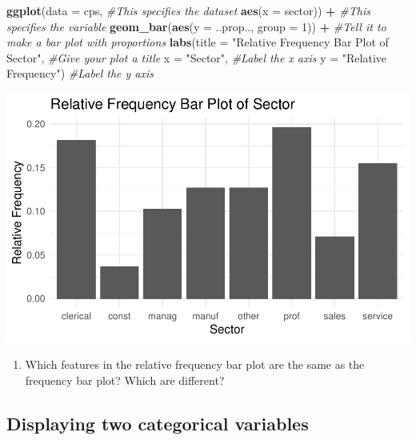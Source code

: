 \documentclass[
]{report}
\newenvironment{Shaded}{\begin{snugshade}}{\end{snugshade}}
\newcommand{\CommentTok}[1]{\textcolor[rgb]{0.56,0.35,0.01}{\textit{#1}}}
\newcommand{\DataTypeTok}[1]{\textcolor[rgb]{0.13,0.29,0.53}{#1}}
\newcommand{\DecValTok}[1]{\textcolor[rgb]{0.00,0.00,0.81}{#1}}
\newcommand{\KeywordTok}[1]{\textcolor[rgb]{0.13,0.29,0.53}{\textbf{#1}}}
\newcommand{\NormalTok}[1]{#1}
\newcommand{\OperatorTok}[1]{\textcolor[rgb]{0.81,0.36,0.00}{\textbf{#1}}}
\newcommand{\StringTok}[1]{\textcolor[rgb]{0.31,0.60,0.02}{#1}}
\providecommand{\tightlist}{%
  \setlength{\itemsep}{0pt}\setlength{\parskip}{0pt}}
\begin{document}
\begin{Shaded}
\begin{Highlighting}[]
\KeywordTok{ggplot}\NormalTok{(}\DataTypeTok{data =}\NormalTok{ cps,   }\CommentTok{#This specifies the dataset}
       \KeywordTok{aes}\NormalTok{(}\DataTypeTok{x =}\NormalTok{ sector)) }\OperatorTok{+}\StringTok{   }\CommentTok{#This specifies the variable}
\StringTok{  }\KeywordTok{geom_bar}\NormalTok{(}\KeywordTok{aes}\NormalTok{(}\DataTypeTok{y =}\NormalTok{ ..prop.., }\DataTypeTok{group =} \DecValTok{1}\NormalTok{)) }\OperatorTok{+}\StringTok{  }\CommentTok{#Tell it to make a bar plot with proportions}
\StringTok{  }\KeywordTok{labs}\NormalTok{(}\DataTypeTok{title =} \StringTok{"Relative Frequency Bar Plot of Sector"}\NormalTok{,  }\CommentTok{#Give your plot a title}
       \DataTypeTok{x =} \StringTok{"Sector"}\NormalTok{,   }\CommentTok{#Label the x axis}
       \DataTypeTok{y =} \StringTok{"Relative Frequency"}\NormalTok{)  }\CommentTok{#Label the y axis}
\end{Highlighting}
\end{Shaded}

\begin{center}\includegraphics[width=0.5\linewidth]{03-EDA-categorical_files/figure-latex/unnamed-chunk-4-1} \end{center}

\begin{enumerate}
\def\labelenumi{\arabic{enumi}.}
\setcounter{enumi}{4}
\tightlist
\item
  Which features in the relative frequency bar plot are the same as the frequency bar plot? Which are different?
\end{enumerate}

\vspace{1in}

\hypertarget{displaying-two-categorical-variables}{%
\subsection{Displaying two categorical variables}\label{displaying-two-categorical-variables}}
\end{document}

